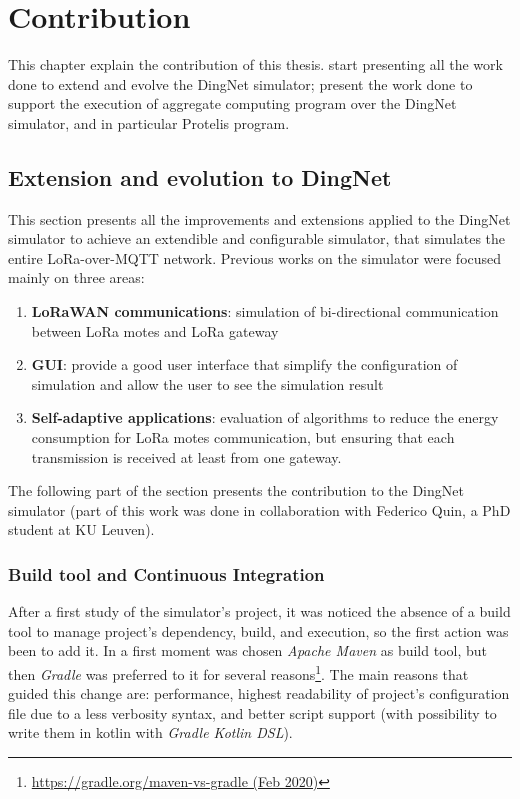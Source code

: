 \chapter{Contribution}
\label{chap:contribution}
This chapter explain the contribution of this thesis.  start presenting all the work done to extend and evolve the DingNet simulator;  present the work done to support the execution of aggregate computing program over the DingNet simulator, and in particular Protelis program. 

\section{Extension and evolution to DingNet}
\label{sec:contributionDingNet}
This section presents all the improvements and extensions applied to the DingNet simulator to achieve an extendible and configurable simulator, that simulates the entire LoRa-over-MQTT network. 
Previous works on the simulator were focused mainly on three areas:
\begin{enumerate}
    \item \textbf{LoRaWAN communications}: simulation of bi-directional communication between LoRa motes and LoRa gateway
    \item \textbf{GUI}: provide a good user interface that simplify the configuration of simulation and allow the user to see the simulation result
    \item \textbf{Self-adaptive applications}: evaluation of algorithms to reduce the energy consumption for LoRa motes communication, but ensuring that each transmission is received at least from one gateway.
\end{enumerate}
The following part of the section presents the contribution to the DingNet simulator (part of this work was done in collaboration with Federico Quin, a PhD student at KU Leuven).
\clearpage
\subsection{Build tool and Continuous Integration}
After a first study of the simulator's project, it was noticed the absence of a build tool to manage project's dependency, build, and execution, so the first action was been to add it. 
In a first moment was chosen \textit{Apache Maven} as build tool, but then \textit{Gradle} was preferred to it for several reasons\footnote{ \href{https://gradle.org/maven-vs-gradle/}{https://gradle.org/maven-vs-gradle (Feb 2020)}}. The main reasons that guided this change are: performance, highest readability of project's configuration file due to a less verbosity syntax, and better script support (with possibility to write them in kotlin with \textit{Gradle Kotlin DSL}). 

